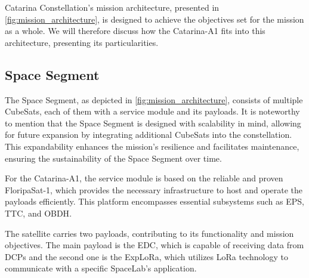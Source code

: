 Catarina Constellation's mission architecture, presented in \autoref{fig:mission_architecture}, is designed to achieve the objectives set for the mission as a whole. We will therefore discuss how the Catarina-A1 fits into this architecture, presenting its particularities.

\subsection{Space Segment}

The Space Segment, as depicted in \autoref{fig:mission_architecture}, consists of multiple CubeSats, each of them with a service module and its payloads. It is noteworthy to mention that the Space Segment is designed with scalability in mind, allowing for future expansion by integrating additional CubeSats into the constellation. This expandability enhances the mission's resilience and facilitates maintenance, ensuring the sustainability of the Space Segment over time.

For the Catarina-A1, the service module is based on the reliable and proven FloripaSat-1, which provides the necessary infrastructure to host and operate the payloads efficiently. This platform encompasses essential subsystems such as \ac{EPS}, \ac{TTC}, and \ac{OBDH}.

The satellite carries two payloads, contributing to its functionality and mission objectives. The main payload is the \ac{EDC}, which is capable of receiving data from \acp{DCP} and the second one is the ExpLoRa, which utilizes LoRa technology to communicate with a specific SpaceLab's application.





